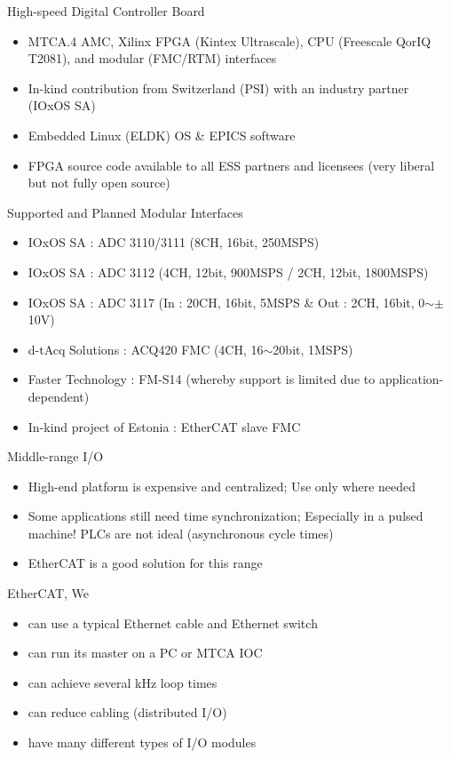 \documentclass[
  9pt
  , table
  , ignorenonframetext
]{beamer}
\begin{document}
\begin{frame}{High-speed Digital Controller Board}
  \begin{itemize}
  \item MTCA.4 AMC, Xilinx FPGA (Kintex Ultrascale), CPU (Freescale QorIQ T2081), and modular (FMC/RTM) interfaces
  \item In-kind contribution from Switzerland (PSI) with an industry partner (IOxOS SA)
  \item Embedded Linux (ELDK) OS \& EPICS software
  \item FPGA source code available to all ESS partners and licensees (very liberal but not fully open source)
  \end{itemize}
  \begin{exampleblock}{Supported and Planned Modular Interfaces}
    \begin{itemize}
    \item{IOxOS SA :} ADC 3110/3111 (8CH, 16bit, 250MSPS)
    \item{IOxOS SA :} ADC 3112 (4CH, 12bit, 900MSPS / 2CH, 12bit, 1800MSPS)
    \item{IOxOS SA :} ADC 3117 (In : 20CH, 16bit, 5MSPS \& Out : 2CH, 16bit, 0$\sim\pm$10V)
    \item{d-tAcq Solutions : } ACQ420 FMC (4CH, 16$\sim$20bit, 1MSPS)
    \item{Faster Technology : } FM-S14 (whereby support is limited due to application-dependent)
    \item{In-kind project of Estonia : } EtherCAT slave FMC
    \end{itemize}
  \end{exampleblock}
\end{frame}

\begin{frame}{Middle-range I/O}
\begin{itemize}
\item High-end platform is expensive and centralized; Use only where needed
\item Some applications still need time synchronization; Especially in a pulsed machine! PLCs are not ideal (asynchronous cycle times)
\item EtherCAT is a good solution for this range
\end{itemize}

\begin{block}{EtherCAT, We}
\begin{itemize}
\item can use a typical Ethernet cable and Ethernet switch
\item can run its master on a PC or MTCA IOC 
\item can achieve several kHz loop times 
\item can reduce cabling (distributed I/O)
\item have many different types of I/O modules
\end{itemize}
\end{block}

\end{frame}
\end{document}
